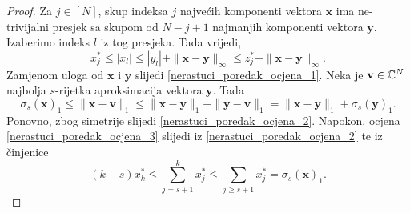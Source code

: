 \documentclass[a4paper,twoside,12pt]{memoir} %
\newcommand{\vect}[1]{\mathbf{#1}}
\renewcommand{\vec}{\vect}
\newcommand{\norm}[1]{\|{#1}\|}
\begin{document}
\begin{proof}
    Za $j \in [N]$, skup indeksa $j$ najve\'cih komponenti vektora $\vec{x}$ ima ne-trivijalni presjek sa skupom od $N-j+1$ najmanjih komponenti vektora $\vec{y}$. Izaberimo indeks $l$ iz tog presjeka. Tada vrijedi, 
    \begin{equation*}
        x_j^* \leq |x_l| \leq |y_l| + \norm{\vec{x} - \vec{y}}_{\infty} \leq z_j^* + \norm{\vec{x} - \vec{y}}_{\infty}.
    \end{equation*}
    Zamjenom uloga od $\vec{x}$ i $\vec{y}$ slijedi \eqref{nerastuci_poredak_ocjena_1}.
    Neka je $\vec{v} \in \C^N$ najbolja $s$-rijetka aproksimacija vektora $\vec{y}$. Tada
    \begin{equation*}
        \sigma_s(\vec{x})_1 \leq \norm{\vec{x} - \vec{v}}_1 \leq \norm{\vec{x} - \vec{y}}_1 + \norm{\vec{y} - \vec{v}}_1 = \norm{\vec{x} - \vec{y}}_1 + \sigma_s(\vec{y})_1 .
    \end{equation*}
    Ponovno, zbog simetrije slijedi \eqref{nerastuci_poredak_ocjena_2}. Napokon, ocjena \eqref{nerastuci_poredak_ocjena_3} slijedi iz \eqref{nerastuci_poredak_ocjena_2} te iz \v{c}injenice
    \begin{equation*}
        (k-s)x_k^* \leq \sum_{j=s+1}^{k}x_j^* \leq \sum_{j \geq s+1} x_j^* = \sigma_s(\vec{x})_1.
    \end{equation*}
\end{proof}
\end{document}
